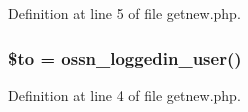 Definition at line 5 of file getnew.\+php.

\subsubsection[{\texorpdfstring{\$to}{$to}}]{\setlength{\rightskip}{0pt plus 5cm}\$to = {\bf ossn\+\_\+loggedin\+\_\+user}()}\hypertarget{getnew_8php_ac19f839b525d6d99d063fe56bf2a6d3b}{}\label{getnew_8php_ac19f839b525d6d99d063fe56bf2a6d3b}


Definition at line 4 of file getnew.\+php.

